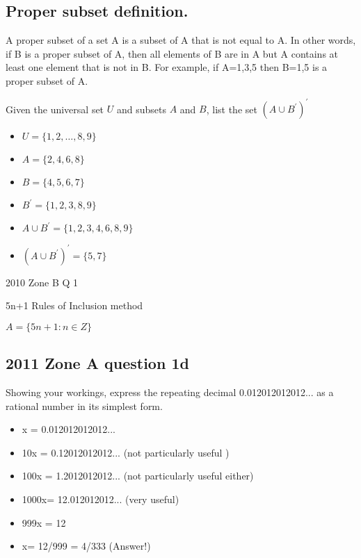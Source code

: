 \subsection{Proper subset definition.} 
A proper subset of a set A is a subset of A that is not equal to A. In other words, if B is a proper subset of A, then all elements of B are in A but A contains at least one element that is not in B. For example, if A={1,3,5} then B={1,5} is a proper subset of A.









Given the universal set $U$ and subsets $A$ and $B$, list the set $(A \cup B^{\prime})^{\prime}$
\begin{itemize}
\item $U=\{1,2,\ldots,8,9\}$
\item $A=\{2,4,6,8\}$
\item $B=\{ 4,5,6,7\}$
\item $B^{\prime}=\{ 1, 2, 3, 8, 9  \}$
\item $A \cup B^{\prime}=\{ 1, 2, 3,4, 6, 8, 9  \}$
\item $(A \cup B^{\prime})^{\prime}=\{ 5,7 \}$
\end{itemize}



2010 Zone B Q 1

5n+1 Rules of Inclusion method

$A = \{5n+1: n \in Z \}$

\subsection*{2011 Zone A question 1d}

Showing your workings, express the repeating decimal 0.012012012012...
as a rational number in its simplest form.


\begin{itemize}
\item x = 0.012012012012...
\item 10x = 0.12012012012... (not particularly useful )
\item 100x = 1.2012012012... (not particularly useful either)
\item 1000x= 12.012012012... (very useful)
\item 999x = 12
\item x= 12/999 = 4/333 (Answer!)
\end{itemize}

